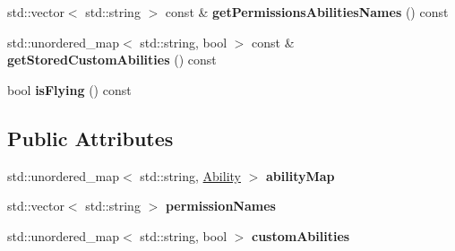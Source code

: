 \begin{DoxyCompactItemize}
\item 
\mbox{\label{struct_abilities_a64c365b006b8d18e3f0a88a42130c565}} 
std\+::vector$<$ std\+::string $>$ const  \& {\bfseries get\+Permissions\+Abilities\+Names} () const
\item 
\mbox{\label{struct_abilities_aa22d4b6a25396fe3b972759a0eb324e0}} 
std\+::unordered\+\_\+map$<$ std\+::string, bool $>$ const  \& {\bfseries get\+Stored\+Custom\+Abilities} () const
\item 
\mbox{\label{struct_abilities_a67f5249607b8b896ae42159ed93561f0}} 
bool {\bfseries is\+Flying} () const
\end{DoxyCompactItemize}
\subsection*{Public Attributes}
\begin{DoxyCompactItemize}
\item 
\mbox{\label{struct_abilities_ae1a588362f2e8df0b5821a3ded49da24}} 
std\+::unordered\+\_\+map$<$ std\+::string, \mbox{\hyperlink{struct_ability}{Ability}} $>$ {\bfseries ability\+Map}
\item 
\mbox{\label{struct_abilities_a522f5aeb366cc7b7c01c375a9e170e23}} 
std\+::vector$<$ std\+::string $>$ {\bfseries permission\+Names}
\item 
\mbox{\label{struct_abilities_ab5089727aef8fa0593f37b83529365b6}} 
std\+::unordered\+\_\+map$<$ std\+::string, bool $>$ {\bfseries custom\+Abilities}
\end{DoxyCompactItemize}
